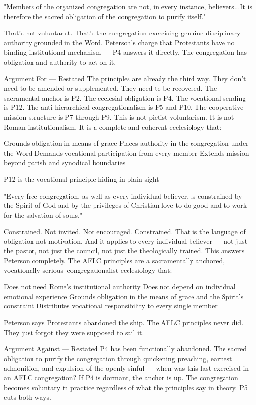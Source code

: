 "Members of the organized congregation are not, in every instance, believers...It is therefore the sacred obligation of the congregation to purify itself."

That's not voluntarist. That's the congregation exercising genuine disciplinary authority grounded in the Word. Peterson's charge that Protestants have no binding institutional mechanism — P4 answers it directly. The congregation has obligation and authority to act on it.

Argument For — Restated
The principles are already the third way.
They don't need to be amended or supplemented. They need to be recovered. The sacramental anchor is P2. The ecclesial obligation is P4. The vocational sending is P12. The anti-hierarchical congregationalism is P5 and P10. The cooperative mission structure is P7 through P9.
This is not pietist voluntarism. It is not Roman institutionalism. It is a complete and coherent ecclesiology that:

Grounds obligation in means of grace
Places authority in the congregation under the Word
Demands vocational participation from every member
Extends mission beyond parish and synodical boundaries

P12 is the vocational principle hiding in plain sight.

"Every free congregation, as well as every individual believer, is constrained by the Spirit of God and by the privileges of Christian love to do good and to work for the salvation of souls."

Constrained. Not invited. Not encouraged. Constrained. That is the language of obligation not motivation. And it applies to every individual believer — not just the pastor, not just the council, not just the theologically trained.
This answers Peterson completely.
The AFLC principles are a sacramentally anchored, vocationally serious, congregationalist ecclesiology that:

Does not need Rome's institutional authority
Does not depend on individual emotional experience
Grounds obligation in the means of grace and the Spirit's constraint
Distributes vocational responsibility to every single member

Peterson says Protestants abandoned the ship. The AFLC principles never did. They just forgot they were supposed to sail it.

Argument Against — Restated
P4 has been functionally abandoned.
The sacred obligation to purify the congregation through quickening preaching, earnest admonition, and expulsion of the openly sinful — when was this last exercised in an AFLC congregation? If P4 is dormant, the anchor is up. The congregation becomes voluntary in practice regardless of what the principles say in theory.
P5 cuts both ways.

